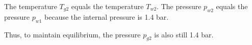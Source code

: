 The temperature \( T_{g2} \) equals the temperature \( T_{w2} \).
The pressure \( p_{w2} \) equals the pressure \( p_{w1} \) because the internal pressure is 1.4 bar.

Thus, to maintain equilibrium, the pressure \( p_{g2} \) is also still 1.4 bar.